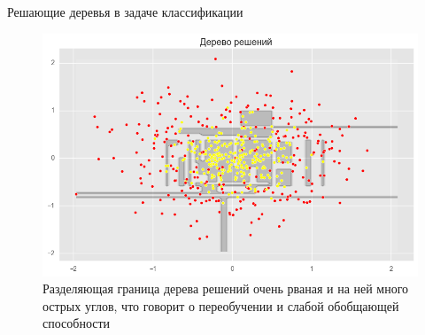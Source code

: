 \documentclass[notheorems, handout]{beamer}
\begin{document}
\begin{frame}{Решающие деревья в задаче классификации}
\begin{figure}[h!]
  \includegraphics[width=0.9 \textwidth]{img/cltree2}
 \caption{Разделяющая граница дерева решений очень рваная и на ней много острых углов, что говорит о переобучении и слабой обобщающей способности}
\end{figure}
\end{frame}
\end{document}
